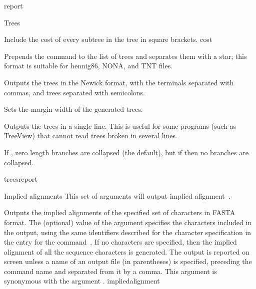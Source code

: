 \begin{command}{report}{}
\begin{arguments}
\begin{argumentgroup}{Trees}
{\begin{description}
                        {Include the cost of every subtree in the tree in square
                        brackets.}
                        {cost}

                        {Prepends the  command to the list of
                        trees and separates them with a star; this format is
                        suitable for hennig86, NONA, and TNT files.}
                        {}
                        
                        {Outputs the trees in the Newick format, with the
                        terminals separated with commas, and trees separated
                        with semicolons.}
                        {}

                        {Sets the margin width of the generated trees.}
                        {}

                        {Outputs the trees in a single line. This is useful for
                        some programs (such as TreeView) that cannot read
                        trees broken in several
                        lines.}
                        {}

                        {If , zero length branches are collapsed (the
                        default), but if  then no branches are
                        collapsed.}
                        {}
                    \end{description}}
                {treesreport}

		\end{argumentgroup}

		\begin{argumentgroup}{Implied alignments}
            {This set of arguments will output implied alignment~\cite{wheeler2003}.} 

                {Outputs the implied alignments of the specified
                set of characters in FASTA format. The (optional) value of the
                argument specifies the characters included
                in the output, using the same identifiers described for the
                character specification in the entry for the command~. If no
                characters are specified, then the implied alignment of all the
                sequence characters is generated. The output is reported on
                screen unless a name of an output file (in parentheses) is
                specified, preceding the command name and separated from it by a
                comma. This argument is synonymous with the argument
                .}
                {impliedalignment}


\end{argumentgroup}
\end{arguments}
\end{command}
